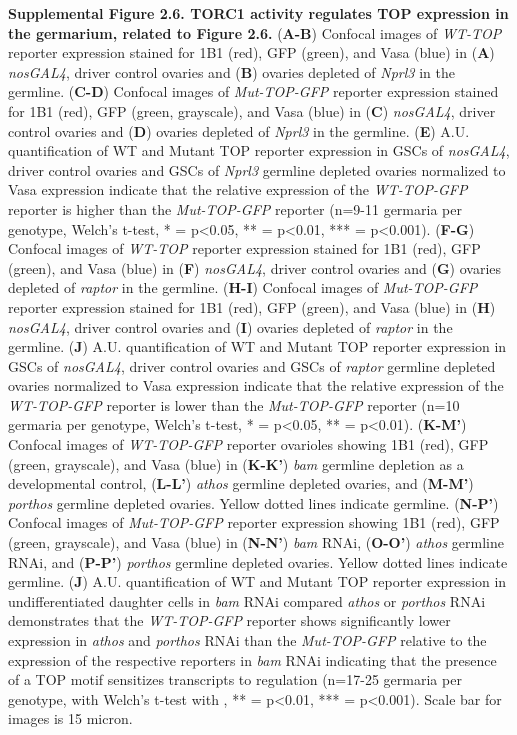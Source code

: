 \documentclass[12pt,twoside]{reedthesis}
\begin{document}
\textbf{Supplemental Figure 2.6. TORC1 activity regulates TOP expression in the
germarium, related to Figure 2.6.} (\textbf{A-B}) Confocal images of \emph{WT-TOP}
reporter expression stained for 1B1 (red), GFP (green), and Vasa (blue)
in (\textbf{A}) \emph{nosGAL4}, driver control ovaries and (\textbf{B}) ovaries
depleted of \emph{Nprl3} in the germline. (\textbf{C-D}) Confocal images of
\emph{Mut-TOP-GFP} reporter expression stained for 1B1 (red), GFP (green,
grayscale), and Vasa (blue) in (\textbf{C}) \emph{nosGAL4}, driver control ovaries
and (\textbf{D}) ovaries depleted of \emph{Nprl3} in the germline. (\textbf{E}) A.U.
quantification of WT and Mutant TOP reporter expression in GSCs of
\emph{nosGAL4}, driver control ovaries and GSCs of \emph{Nprl3} germline depleted
ovaries normalized to Vasa expression indicate that the relative
expression of the \emph{WT-TOP-GFP} reporter is higher than the \emph{Mut-TOP-GFP}
reporter (n=9-11 germaria per genotype, Welch's t-test, * = p\textless0.05,
** = p\textless0.01, *** = p\textless0.001). (\textbf{F-G}) Confocal images of
\emph{WT-TOP} reporter expression stained for 1B1 (red), GFP (green), and
Vasa (blue) in (\textbf{F}) \emph{nosGAL4}, driver control ovaries and (\textbf{G})
ovaries depleted of \emph{raptor} in the germline. (\textbf{H-I}) Confocal images
of \emph{Mut-TOP-GFP} reporter expression stained for 1B1 (red), GFP (green),
and Vasa (blue) in (\textbf{H}) \emph{nosGAL4}, driver control ovaries and (\textbf{I})
ovaries depleted of \emph{raptor} in the germline. (\textbf{J}) A.U.
quantification of WT and Mutant TOP reporter expression in GSCs of
\emph{nosGAL4}, driver control ovaries and GSCs of \emph{raptor} germline depleted
ovaries normalized to Vasa expression indicate that the relative
expression of the \emph{WT-TOP-GFP} reporter is lower than the \emph{Mut-TOP-GFP}
reporter (n=10 germaria per genotype, Welch's t-test, * = p\textless0.05, **
= p\textless0.01). (\textbf{K-M'}) Confocal images of \emph{WT-TOP-GFP} reporter
ovarioles showing 1B1 (red), GFP (green, grayscale), and Vasa (blue) in
(\textbf{K-K'}) \emph{bam} germline depletion as a developmental control,
(\textbf{L-L'}) \emph{athos} germline depleted ovaries, and (\textbf{M-M'}) \emph{porthos}
germline depleted ovaries. Yellow dotted lines indicate germline.
(\textbf{N-P'}) Confocal images of \emph{Mut-TOP-GFP} reporter expression showing
1B1 (red), GFP (green, grayscale), and Vasa (blue) in (\textbf{N-N'}) \emph{bam}
RNAi, (\textbf{O-O'}) \emph{athos} germline RNAi, and (\textbf{P-P'}) \emph{porthos}
germline depleted ovaries. Yellow dotted lines indicate germline.
(\textbf{J}) A.U. quantification of WT and Mutant TOP reporter expression in
undifferentiated daughter cells in \emph{bam} RNAi compared \emph{athos} or
\emph{porthos} RNAi demonstrates that the \emph{WT-TOP-GFP} reporter shows
significantly lower expression in \emph{athos} and \emph{porthos} RNAi than the
\emph{Mut-TOP-GFP} relative to the expression of the respective reporters in
\emph{bam} RNAi indicating that the presence of a TOP motif sensitizes
transcripts to regulation (n=17-25 germaria per genotype, with Welch's
t-test with , ** = p\textless0.01, *** = p\textless0.001). Scale bar for images
is 15 micron.
\end{document}
